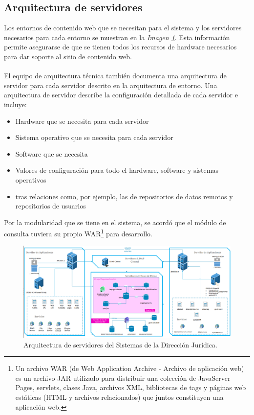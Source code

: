 \documentclass[../reportesINE.tex]{subfiles}
\begin{document}
\subsection{Arquitectura de servidores}
Los entornos de contenido web que se necesitan para el sistema y los servidores necesarios para cada entorno se muestran en la \textit{Imagen \ref{fig:arquitectura}}. Esta información permite asegurarse de que se tienen todos los recursos de hardware necesarios para dar soporte al sitio de contenido web. \\ \\
El equipo de arquitectura técnica también documenta una arquitectura de servidor para cada servidor descrito en la arquitectura de entorno. Una arquitectura de servidor describe la configuración detallada de cada servidor e incluye: \\ 
\begin{itemize}
\item Hardware que se necesita para cada servidor
\item Sistema operativo que se necesita para cada servidor
\item Software que se necesita
\item Valores de configuración para todo el hardware, software y sistemas operativos
\item tras relaciones como, por ejemplo, las de repositorios de datos remotos y repositorios de usuarios \\
\end{itemize} 

Por la modularidad que se tiene en el sistema, se acordó que el módulo de consulta tuviera su propio WAR\footnote{Un archivo WAR (de Web Application Archive - Archivo de aplicación web) es un archivo JAR utilizado para distribuir una colección de JavaServer Pages, servlets, clases Java, archivos XML, bibliotecas de tags y páginas web estáticas (HTML y archivos relacionados) que juntos constituyen una aplicación web.} para desarrollo.

\begin{figure}[h]
  \centering
  \includegraphics[width=\linewidth]{img/arquitectura.png}
  \caption{Arquitectura de servidores del Sistemas de la Dirección Jurídica.}
  \label{fig:arquitectura}
\end{figure}
\end{document}
